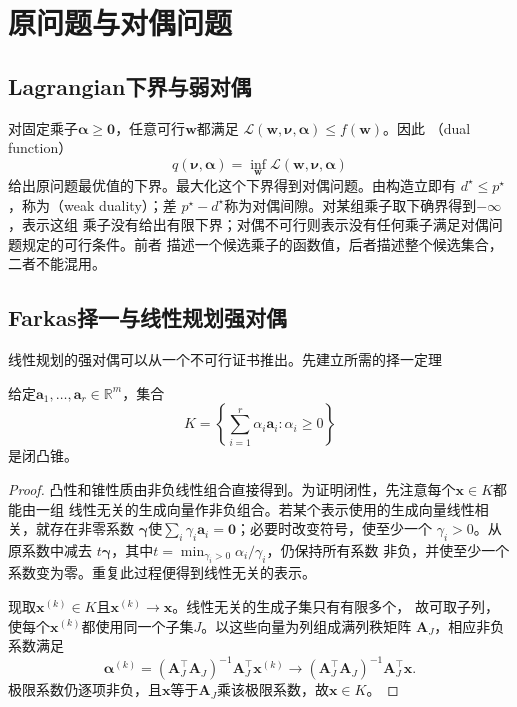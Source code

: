 \section{原问题与对偶问题}
\label{sec:opt-duality}

\subsection{Lagrangian下界与弱对偶}

对固定乘子$\bm{\alpha}\geq\bm{0}$，任意可行$\bm{w}$都满足
$\mathcal{L}(\bm{w},\bm{\nu},\bm{\alpha})\leq f(\bm{w})$。因此
（dual function）
\[
  q(\bm{\nu},\bm{\alpha})
  =\inf_{\bm{w}}\mathcal{L}(\bm{w},\bm{\nu},\bm{\alpha})
\]
给出原问题最优值的下界。最大化这个下界得到对偶问题。由构造立即有
$d^{\star}\leq p^{\star}$，称为（weak duality）；差
$p^{\star}-d^{\star}$称为对偶间隙。对某组乘子取下确界得到$-\infty$，表示这组
乘子没有给出有限下界；对偶不可行则表示没有任何乘子满足对偶问题规定的可行条件。前者
描述一个候选乘子的函数值，后者描述整个候选集合，二者不能混用。

\subsection{Farkas择一与线性规划强对偶}

线性规划的强对偶可以从一个不可行证书推出。先建立所需的择一定理

\begin{lemma}[有限生成锥的闭性]
\label{lem:opt-finitely-generated-cone}
给定$\bm{a}_1,\ldots,\bm{a}_r\in\mathbb{R}^m$，集合
\[
  K=\left\{\sum_{i=1}^r\alpha_i\bm{a}_i:\alpha_i\geq0\right\}
\]
是闭凸锥。
\end{lemma}

\begin{proof}
凸性和锥性质由非负线性组合直接得到。为证明闭性，先注意每个$\bm{x}\in K$都能由一组
线性无关的生成向量作非负组合。若某个表示使用的生成向量线性相关，就存在非零系数
$\bm{\gamma}$使$\sum_i\gamma_i\bm{a}_i=\bm{0}$；必要时改变符号，使至少一个
$\gamma_i>0$。从原系数中减去
$t\bm{\gamma}$，其中$t=\min_{\gamma_i>0}\alpha_i/\gamma_i$，仍保持所有系数
非负，并使至少一个系数变为零。重复此过程便得到线性无关的表示。

现取$\bm{x}^{(k)}\in K$且$\bm{x}^{(k)}\to\bm{x}$。线性无关的生成子集只有有限多个，
故可取子列，使每个$\bm{x}^{(k)}$都使用同一个子集$J$。以这些向量为列组成满列秩矩阵
$\bm{A}_J$，相应非负系数满足
\[
  \bm{\alpha}^{(k)}
  =(\bm{A}_J^{\top}\bm{A}_J)^{-1}\bm{A}_J^{\top}\bm{x}^{(k)}
  \longrightarrow
  (\bm{A}_J^{\top}\bm{A}_J)^{-1}\bm{A}_J^{\top}\bm{x}.
\]
极限系数仍逐项非负，且$\bm{x}$等于$\bm{A}_J$乘该极限系数，故$\bm{x}\in K$。
\end{proof}

